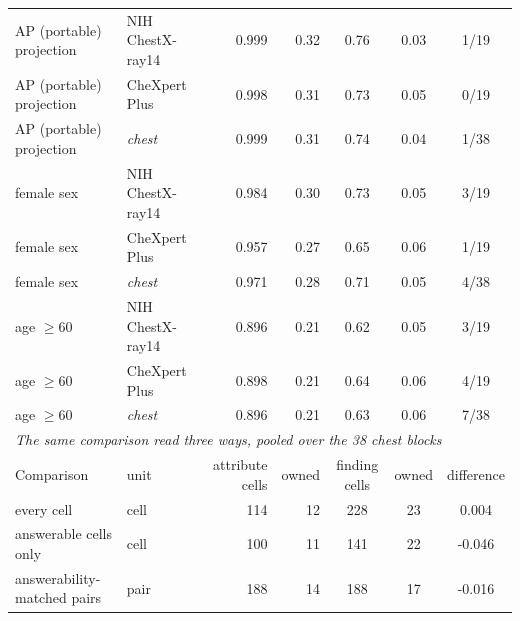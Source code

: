\documentclass{article}
\begin{document}
\begin{table}[htbp]
{\begin{tabular}{llrrccc}
\midrule
AP (portable) projection & NIH ChestX-ray14 & 0.999 & 0.32 & 0.76 & 0.03 & 1/19 \\
AP (portable) projection & CheXpert Plus & 0.998 & 0.31 & 0.73 & 0.05 & 0/19 \\
AP (portable) projection & \textit{chest} & 0.999 & 0.31 & 0.74 & 0.04 & 1/38 \\
female sex & NIH ChestX-ray14 & 0.984 & 0.30 & 0.73 & 0.05 & 3/19 \\
female sex & CheXpert Plus & 0.957 & 0.27 & 0.65 & 0.06 & 1/19 \\
female sex & \textit{chest} & 0.971 & 0.28 & 0.71 & 0.05 & 4/38 \\
age $\geq60$ & NIH ChestX-ray14 & 0.896 & 0.21 & 0.62 & 0.05 & 3/19 \\
age $\geq60$ & CheXpert Plus & 0.898 & 0.21 & 0.64 & 0.06 & 4/19 \\
age $\geq60$ & \textit{chest} & 0.896 & 0.21 & 0.63 & 0.06 & 7/38 \\
\midrule
\multicolumn{7}{l}{\textit{The same comparison read three ways, pooled over the 38 chest blocks}} \\
Comparison & unit & attribute cells & owned & finding cells & owned & difference \\
\midrule
every cell & cell & 114 & 12 & 228 & 23 & 0.004 \\
answerable cells only & cell & 100 & 11 & 141 & 22 & -0.046 \\
answerability-matched pairs & pair & 188 & 14 & 188 & 17 & -0.016 \\
\bottomrule
\end{tabular}}
\end{table}
\begin{table}[t]
\centering
\setlength{\tabcolsep}{4pt}
\caption{\textbf{Attributes and findings by clean-answer AUROC.} The nine-direction family's cells binned by the clean answer's AUROC against the question's own label; each entry is owned cells of cells in the bin.}
\label{tab:cf-attr-strat}
\end{table}
\end{document}
